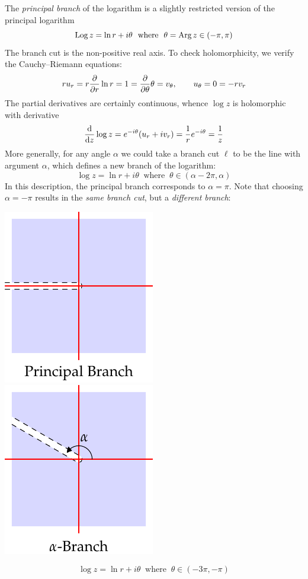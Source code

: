 \begin{minipage}[t]{0.7\linewidth}\vspace{0pt}
	The \emph{principal branch} of the logarithm is a slightly restricted version of the principal logarithm
	\[
		\operatorname{Log} z=\ln r+i\theta\ \text{ where }\ \theta=\operatorname{Arg} z\in(-\pi,\pi)
	\]
	The branch cut is the non-positive real axis. To check holomorphicity, we verify the Cauchy--Riemann equations:\footnotemark
	\[
		ru_r=r\frac{\partial }{\partial r}\ln r=1=\frac{\partial }{\partial \theta}\theta=v_\theta
		,\qquad
		u_\theta=0=-rv_r
	\]
	The partial derivatives are certainly continuous, whence $\log z$ is holomorphic with derivative 
	\[
		\frac{\mathrm{d} }{\mathrm{d} z}\log z=e^{-i\theta}(u_r+iv_r)=\frac 1re^{-i\theta}=\frac 1z
	\]
	More generally, for any angle $\alpha$ we could take a branch cut $\ell$ to be the line with argument $\alpha$, which defines a new branch of the logarithm:
	\[
		\log z=\ln r+i\theta
		\ \text{ where }\
		\theta\in (\alpha-2\pi,\alpha)
	\]
	In this description, the principal branch corresponds to $\alpha=\pi$. Note that choosing $\alpha=-\pi$ results in the \emph{same branch cut}, but a \emph{different branch}:
\end{minipage}
\hfill
\begin{minipage}[t]{0.29\linewidth}\vspace{0pt}
	\flushright\includegraphics{branch1}
	\medbreak
	\includegraphics{branch2}
\end{minipage}
\[
	\log z=\ln r+i\theta\ \text{ where }\ \theta\in(-3\pi,-\pi)
\]


